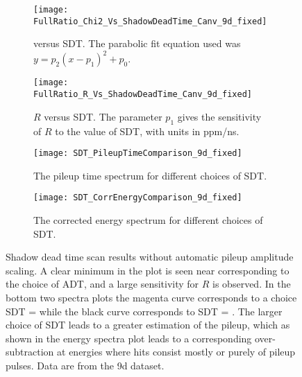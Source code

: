 \begin{figure}
\centering
    \begin{subfigure}[t]{0.45\textwidth}
        \centering
        \texttt{[image: FullRatio\_Chi2\_Vs\_ShadowDeadTime\_Canv\_9d\_fixed]}
        \caption{\chisq versus SDT. The parabolic fit equation used was $y = p_{2}(x - p_{1})^{2} + p_{0}.$}
    \end{subfigure}%
    \hspace{1cm}
    \begin{subfigure}[t]{0.45\textwidth}
        \centering
        \texttt{[image: FullRatio\_R\_Vs\_ShadowDeadTime\_Canv\_9d\_fixed]}
        \caption{$R$ versus SDT. The parameter $p_{1}$ gives the sensitivity of $R$ to the value of SDT, with units in ppm/ns.}
    \end{subfigure}

    \begin{subfigure}[t]{0.45\textwidth}
        \centering
        \texttt{[image: SDT\_PileupTimeComparison\_9d\_fixed]}
        \caption{The pileup time spectrum for different choices of SDT.}
    \end{subfigure}%
    \hspace{1cm}
    \begin{subfigure}[t]{0.45\textwidth}
        \centering
        \texttt{[image: SDT\_CorrEnergyComparison\_9d\_fixed]}
        \caption{The corrected energy spectrum for different choices of SDT.}
    \end{subfigure}
\caption[Pileup shadow dead time scan without automatic pileup amplitude scaling]{Shadow dead time scan results without automatic pileup amplitude scaling. A clear minimum in the \chisq plot is seen near  corresponding to the choice of ADT, and a large sensitivity for $R$ is observed. In the bottom two spectra plots the magenta curve corresponds to a choice SDT =  while the black curve corresponds to SDT = . The larger choice of SDT leads to a greater estimation of the pileup, which as shown in the energy spectra plot leads to a corresponding over-subtraction at energies where hits consist mostly or purely of pileup pulses. Data are from the 9d dataset.}
\label{fig:SDTscan_noScaling}
\end{figure}


